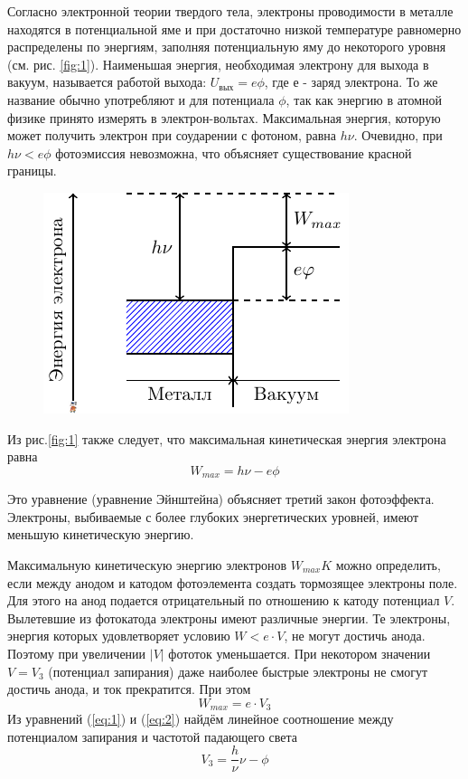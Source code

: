 Согласно электронной теории твердого тела, электроны проводимости в металле находятся в потенциальной яме и при достаточно низкой температуре равномерно распределены по энергиям, заполняя потенциальную яму до некоторого уровня (см. рис. \ref{fig:1}).
Наименьшая энергия, необходимая электрону для выхода в вакуум, называется работой выхода: $U_{\text{вых}} = e\phi$, где $е$ - заряд электрона. То же название обычно употребляют и для потенциала $\phi$, так как энергию в атомной физике принято измерять в электрон-вольтах. Максимальная энергия, которую может получить электрон при соударении с фотоном, равна $h \nu$. Очевидно, при $h \nu<e\phi$ фотоэмиссия невозможна, что объясняет существование красной границы.
\begin{figure}[h]
	\centering
	\includegraphics[width=\linewidth]{fig/fig1}
	\caption{}
	\label{fig:2}
\end{figure}
Из рис.\ref{fig:1} также следует, что максимальная кинетическая энергия электрона равна
\begin{equation}
	\label{eq:1}
 	W_{max}=h \nu -e\phi
 \end{equation} 

Это уравнение (уравнение Эйнштейна) объясняет третий закон
фотоэффекта. Электроны, выбиваемые с более глубоких энергетических уровней, имеют меньшую кинетическую энергию.

Максимальную кинетическую энергию электронов $W_{max}K$ можно определить, если между анодом и катодом фотоэлемента создать тормозящее электроны поле. Для этого на анод подается отрицательный по отношению к катоду потенциал $V$. Вылетевшие из фотокатода электроны имеют различные энергии. Те электроны, энергия которых удовлетворяет условию $W < e\cdot V$, не могут достичь анода. Поэтому при увеличении $ |V|$ фототок уменьшается. При некотором значении $V = V_{3}$ (потенциал запирания) даже наиболее быстрые электроны не смогут достичь анода, и ток прекратится. При этом
\begin{equation}
	\label{eq:2}
	W_{max}=e\cdot V_{3}
\end{equation}
Из уравнений (\ref{eq:1}) и (\ref{eq:2}) найдём линейное соотношение между потенциалом запирания и частотой падающего света
\begin{equation}
	\label{eq:3}
	V_{3}=\frac h\nu \nu-\phi
\end{equation}

